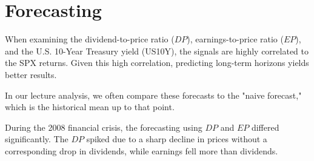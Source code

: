 \documentclass{article}
\begin{document}
\section{Forecasting}
When examining the dividend-to-price ratio ($DP$), earnings-to-price ratio ($EP$), and the U.S. 10-Year Treasury yield (US10Y), the signals are highly correlated to the SPX returns. Given this high correlation, predicting long-term horizons yields better results.

In our lecture analysis, we often compare these forecasts to the "naive forecast," which is the historical mean up to that point.

During the 2008 financial crisis, the forecasting using $DP$ and $EP$ differed significantly. The $DP$ spiked due to a sharp decline in prices without a corresponding drop in dividends, while earnings fell more than dividends.





\end{document}
